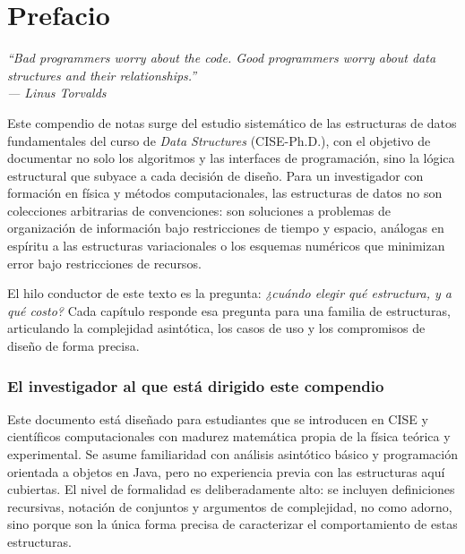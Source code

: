 
\chapter*{Prefacio}

\begin{flushright}
\itshape
``Bad programmers worry about the code. Good programmers worry about data structures and their relationships.''\\[4pt]
\upshape --- Linus Torvalds
\end{flushright}
\bigskip

Este compendio de notas surge del estudio sistemático de las estructuras de datos
fundamentales del curso de \textit{Data Structures} (CISE-Ph.D.), con el objetivo de
documentar no solo los algoritmos y las interfaces de programación, sino la lógica
estructural que subyace a cada decisión de diseño. Para un investigador con formación
en física y métodos computacionales, las estructuras de datos no son colecciones
arbitrarias de convenciones: son soluciones a problemas de organización de información
bajo restricciones de tiempo y espacio, análogas en espíritu a las estructuras variacionales
o los esquemas numéricos que minimizan error bajo restricciones de recursos.

El hilo conductor de este texto es la pregunta: \textit{¿cuándo elegir qué estructura, y
a qué costo?} Cada capítulo responde esa pregunta para una familia de estructuras,
articulando la complejidad asintótica, los casos de uso y los compromisos de diseño de
forma precisa.

\subsection*{El investigador al que está dirigido este compendio}

Este documento está diseñado para estudiantes que se introducen en CISE y científicos
computacionales con madurez matemática propia de la física teórica y experimental. Se
asume familiaridad con análisis asintótico básico y programación orientada a objetos en
Java, pero no experiencia previa con las estructuras aquí cubiertas. El nivel de formalidad
es deliberadamente alto: se incluyen definiciones recursivas, notación de conjuntos y
argumentos de complejidad, no como adorno, sino porque son la única forma precisa de
caracterizar el comportamiento de estas estructuras.

